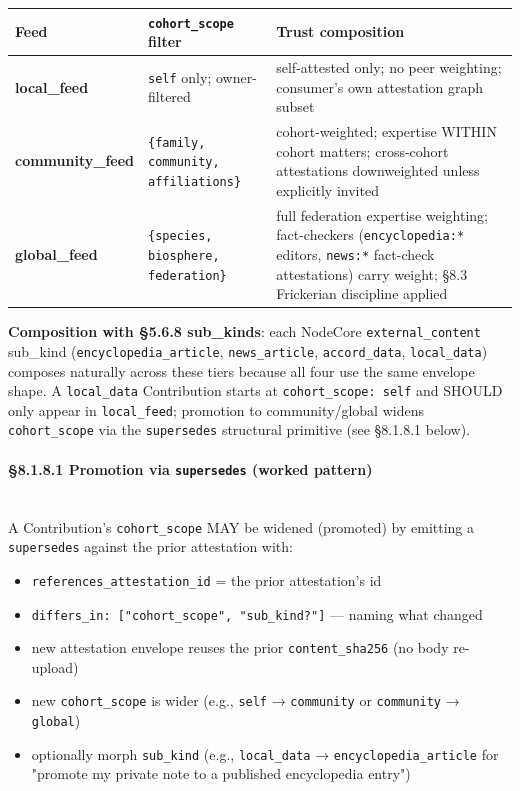 \documentclass[10pt]{article}
\begin{document}
{\footnotesize
\begin{longtable}{|p{5.33cm}|p{5.33cm}|p{5.33cm}|}\hline
\textbf{Feed} & \textbf{\texttt{cohort\_scope} filter} & \textbf{Trust composition} \\ \hline\endhead
\textbf{local\_feed} & \texttt{self} only; owner-filtered & self-attested only; no peer weighting; consumer's own attestation graph subset \\ \hline
\textbf{community\_feed} & \texttt{\{family, community, affiliations\}} & cohort-weighted; expertise WITHIN cohort matters; cross-cohort attestations downweighted unless explicitly invited \\ \hline
\textbf{global\_feed} & \texttt{\{species, biosphere, federation\}} & full federation expertise weighting; fact-checkers (\texttt{encyclopedia:*} editors, \texttt{news:*} fact-check attestations) carry weight; §8.3 Frickerian discipline applied \\ \hline
\end{longtable}}


\textbf{Composition with §5.6.8 sub\_kinds}: each NodeCore \texttt{external\_content} sub\_kind (\texttt{encyclopedia\_article}, \texttt{news\_article}, \texttt{accord\_data}, \texttt{local\_data}) composes naturally across these tiers because all four use the same envelope shape. A \texttt{local\_data} Contribution starts at \texttt{cohort\_scope: self} and SHOULD only appear in \texttt{local\_feed}; promotion to community/global widens \texttt{cohort\_scope} via the \texttt{supersedes} structural primitive (see §8.1.8.1 below).


\paragraph{§8.1.8.1 Promotion via \texttt{supersedes} (worked pattern)}\mbox{}\\


A Contribution's \texttt{cohort\_scope} MAY be widened (promoted) by emitting a \texttt{supersedes} against the prior attestation with:


\begin{itemize}\setlength\itemsep{0pt}
\item \texttt{references\_attestation\_id} = the prior attestation's id
\item \texttt{differs\_in: ["cohort\_scope", "sub\_kind?"]} — naming what changed
\item new attestation envelope reuses the prior \texttt{content\_sha256} (no body re-upload)
\item new \texttt{cohort\_scope} is wider (e.g., \texttt{self} → \texttt{community} or \texttt{community} → \texttt{global})
\item optionally morph \texttt{sub\_kind} (e.g., \texttt{local\_data} → \texttt{encyclopedia\_article} for "promote my private note to a published encyclopedia entry")
\end{itemize}
\end{document}
